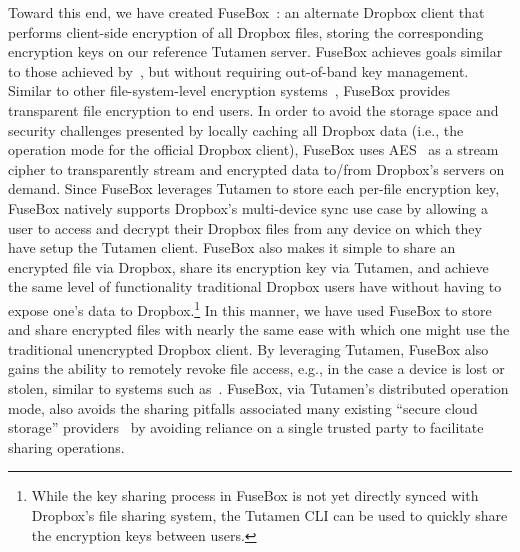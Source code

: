Toward this end, we have created FuseBox~\cite{fusebox}: an alternate
Dropbox client that performs client-side encryption of all Dropbox
files, storing the corresponding encryption keys on our reference
Tutamen server. FuseBox achieves goals similar to those achieved
by~\cite{goh2003}, but without requiring out-of-band key
management. Similar to other file-system-level encryption
systems~\cite{blaze1993, Cattaneo2001, halcrow}, FuseBox provides
transparent file encryption to end users. In order to avoid the
storage space and security challenges presented by locally caching all
Dropbox data (i.e., the operation mode for the official Dropbox
client), FuseBox uses AES~\cite{daemen1999, nist2001} as a stream
cipher to transparently stream and encrypted data to/from Dropbox's
servers on demand. Since FuseBox leverages Tutamen to store each
per-file encryption key, FuseBox natively supports Dropbox's
multi-device sync use case by allowing a user to access and decrypt
their Dropbox files from any device on which they have setup the
Tutamen client. FuseBox also makes it simple to share an encrypted
file via Dropbox, share its encryption key via Tutamen, and achieve
the same level of functionality traditional Dropbox users have without
having to expose one's data to Dropbox.\footnote{While the key sharing
  process in FuseBox is not yet directly synced with Dropbox's file
  sharing system, the Tutamen CLI can be used to quickly share the
  encryption keys between users.} In this manner, we have used FuseBox
to store and share encrypted files with nearly the same ease with
which one might use the traditional unencrypted Dropbox client. By
leveraging Tutamen, FuseBox also gains the ability to remotely revoke
file access, e.g., in the case a device is lost or stolen, similar to
systems such as~\cite{geambasu2011}. FuseBox, via Tutamen's
distributed operation mode, also avoids the sharing pitfalls
associated many existing ``secure cloud storage''
providers~\cite{wilson2014} by avoiding reliance on a single trusted
party to facilitate sharing operations.

